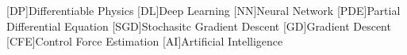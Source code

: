 [DP]{Differentiable Physics}
[DL]{Deep Learning}
[NN]{Neural Network}
[PDE]{Partial Differential Equation}
[SGD]{Stochasitc Gradient Descent}
[GD]{Gradient Descent}
[CFE]{Control Force Estimation}
[AI]{Artificial Intelligence}

